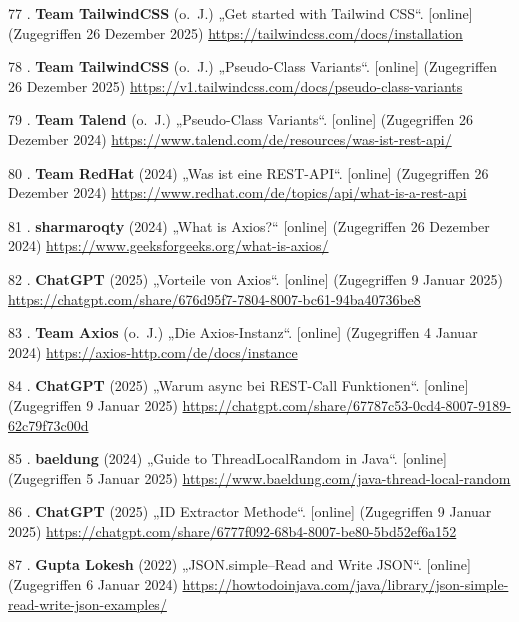 \documentclass[
    headings=optiontotocandhead,%
    twoside,
    numbers=noenddot,%
    12pt, %
    titlepage, %
    parskip=full, %
    listof=leveldown, 
    numbers=noenddot, %
    a4paper,DIV=14,
    BCOR=15mm,
]{scrbook}
\newlength{\cslhangindent}
\newenvironment{cslreferences}%
  {\setlength{\parindent}{0pt}%
  \everypar{\setlength{\hangindent}{\cslhangindent}}\ignorespaces}%
  {\par}
\begin{document}
\begin{cslreferences}
\leavevmode\hypertarget{ref-TailwindCSS-Docs-GettingStarted}{}%
77 . \textbf{Team TailwindCSS} (o.~J.) „Get started with Tailwind CSS``.
{[}online{]} (Zugegriffen 26 Dezember 2025)
\url{https://tailwindcss.com/docs/installation}

\leavevmode\hypertarget{ref-TailwindCSS-DocsV1}{}%
78 . \textbf{Team TailwindCSS} (o.~J.) „Pseudo-Class Variants``.
{[}online{]} (Zugegriffen 26 Dezember 2025)
\url{https://v1.tailwindcss.com/docs/pseudo-class-variants}

\leavevmode\hypertarget{ref-Talend-REST}{}%
79 . \textbf{Team Talend} (o.~J.) „Pseudo-Class Variants``. {[}online{]}
(Zugegriffen 26 Dezember 2024)
\url{https://www.talend.com/de/resources/was-ist-rest-api/}

\leavevmode\hypertarget{ref-RedHat-REST}{}%
80 . \textbf{Team RedHat} (2024) „Was ist eine REST-API``. {[}online{]}
(Zugegriffen 26 Dezember 2024)
\url{https://www.redhat.com/de/topics/api/what-is-a-rest-api}

\leavevmode\hypertarget{ref-GeeksForGeeks-Axios}{}%
81 . \textbf{sharmaroqty} (2024) „What is Axios?{}`` {[}online{]}
(Zugegriffen 26 Dezember 2024)
\url{https://www.geeksforgeeks.org/what-is-axios/}

\leavevmode\hypertarget{ref-gpt-AxiosVT}{}%
82 . \textbf{ChatGPT} (2025) „Vorteile von Axios``. {[}online{]}
(Zugegriffen 9 Januar 2025)
\url{https://chatgpt.com/share/676d95f7-7804-8007-bc61-94ba40736be8}

\leavevmode\hypertarget{ref-Axios-Docs-Instance}{}%
83 . \textbf{Team Axios} (o.~J.) „Die Axios-Instanz``. {[}online{]}
(Zugegriffen 4 Januar 2024)
\url{https://axios-http.com/de/docs/instance}

\leavevmode\hypertarget{ref-gpt-WarumAsync}{}%
84 . \textbf{ChatGPT} (2025) „Warum async bei REST-Call Funktionen``.
{[}online{]} (Zugegriffen 9 Januar 2025)
\url{https://chatgpt.com/share/67787c53-0cd4-8007-9189-62c79f73c00d}

\leavevmode\hypertarget{ref-Baeldung-JavaRandom}{}%
85 . \textbf{baeldung} (2024) „Guide to ThreadLocalRandom in Java``.
{[}online{]} (Zugegriffen 5 Januar 2025)
\url{https://www.baeldung.com/java-thread-local-random}

\leavevmode\hypertarget{ref-gpt-IdExtractor}{}%
86 . \textbf{ChatGPT} (2025) „ID Extractor Methode``. {[}online{]}
(Zugegriffen 9 Januar 2025)
\url{https://chatgpt.com/share/6777f092-68b4-8007-be80-5bd52ef6a152}

\leavevmode\hypertarget{ref-HowToDoInJava-JSON}{}%
87 . \textbf{Gupta Lokesh} (2022) „JSON.simple--Read and Write JSON``.
{[}online{]} (Zugegriffen 6 Januar 2024)
\url{https://howtodoinjava.com/java/library/json-simple-read-write-json-examples/}


\end{cslreferences}
\end{document}
